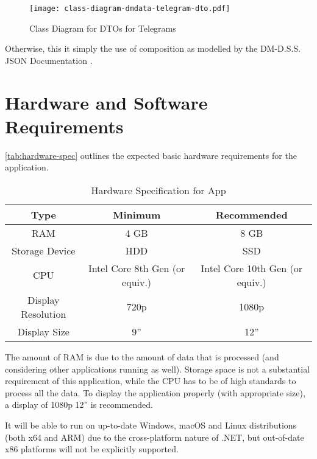 \begin{figure}[htp]
    \centering
    \texttt{[image: class-diagram-dmdata-telegram-dto.pdf]}
    \caption{Class Diagram for DTOs for Telegrams}
    \label{fig:class-diagram-dmdata-telegram-dto}
\end{figure}

Otherwise, this it simply the use of composition as modelled by the DM-D.S.S. JSON Documentation \autocite{dmdata-references-telegram}.

\section{Hardware and Software Requirements}

\autoref{tab:hardware-spec} outlines the expected basic hardware requirements for the application.

\begin{table}[htp]
    \centering

    \begin{tabular}{ccc}
        Type               & Minimum                        & Recommended                     \\
        \hline
        RAM                & 4 GB                           & 8 GB                            \\
        Storage Device     & HDD                            & SSD                             \\
        CPU                & Intel Core 8th Gen (or equiv.) & Intel Core 10th Gen (or equiv.) \\
        Display Resolution & 720p                           & 1080p                           \\
        Display Size       & 9''                            & 12''
    \end{tabular}
    \caption{Hardware Specification for App}
    \label{tab:hardware-spec}
\end{table}

The amount of RAM is due to the amount of data that is processed (and considering other applications running as well). Storage space is not a substantial requirement of this application, while the CPU has to be of high standards to process all the data. To display the application properly (with appropriate size), a display of 1080p 12'' is recommended.

It will be able to run on up-to-date Windows, macOS and Linux distributions (both x64 and ARM) due to the cross-platform nature of .NET, but out-of-date x86 platforms will not be explicitly supported.


